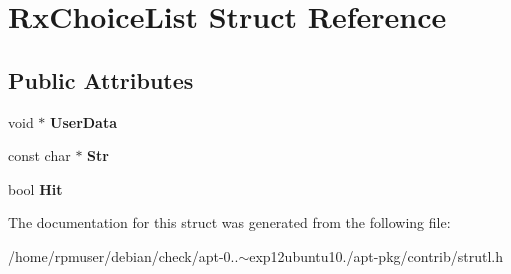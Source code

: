 \section{\-Rx\-Choice\-List \-Struct \-Reference}
\label{structRxChoiceList}
\subsection*{\-Public \-Attributes}
\begin{DoxyCompactItemize}
\item 
void $\ast$ {\bfseries \-User\-Data}\label{structRxChoiceList_a95e9428e2338955907e513203842a9ec}

\item 
const char $\ast$ {\bfseries \-Str}\label{structRxChoiceList_a83ddceec53599310a13048586c0a8586}

\item 
bool {\bfseries \-Hit}\label{structRxChoiceList_a8db34823a4547b90cf7c26ef7921a26f}

\end{DoxyCompactItemize}


\-The documentation for this struct was generated from the following file\-:\begin{DoxyCompactItemize}
\item 
/home/rpmuser/debian/check/apt-\/0..$\sim$exp12ubuntu10./apt-\/pkg/contrib/strutl.\-h\end{DoxyCompactItemize}
